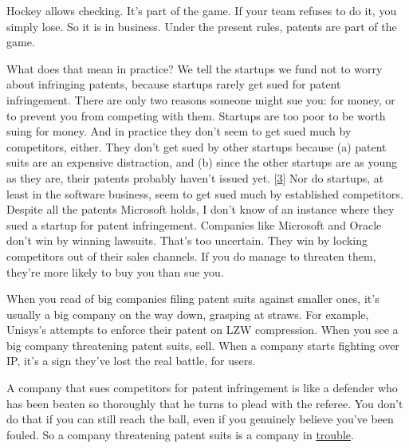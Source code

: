 Hockey allows
                  checking. It's part of the game. If your team refuses to do
                  it, you simply lose. So it is in business. Under the present
                  rules, patents are part of the game.

What does that
                  mean in practice? We tell the startups we fund not to worry
                  about infringing patents, because startups rarely get sued for
                  patent infringement. There are only two reasons someone might
                  sue you: for money, or to prevent you from competing with
                  them. Startups are too poor to be worth suing for money. And
                  in practice they don't seem to get sued much by competitors,
                  either. They don't get sued by other startups because (a)
                  patent suits are an expensive distraction, and (b) since the
                  other startups are as young as they are, their patents
                  probably haven't issued yet.
                  [\href{\#f3n}{3}]
                  Nor do startups, at least in the software business, seem to
                  get sued much by established competitors. Despite all the
                  patents Microsoft holds, I don't know of an instance where
                  they sued a startup for patent infringement. Companies like
                  Microsoft and Oracle don't win by winning lawsuits. That's too
                  uncertain. They win by locking competitors out of their sales
                  channels. If you do manage to threaten them, they're more
                  likely to buy you than sue you.

When you read of
                  big companies filing patent suits against smaller ones, it's
                  usually a big company on the way down, grasping at straws. For
                  example, Unisys's attempts to enforce their patent on LZW
                  compression. When you see a big company threatening patent
                  suits, sell. When a company starts fighting over IP, it's a
                  sign they've lost the real battle, for users.

A
                  company that sues competitors for patent infringement is like
                  a defender who has been beaten so thoroughly that he turns to
                  plead with the referee. You don't do that if you can still
                  reach the ball, even if you genuinely believe you've been
                  fouled. So a company threatening patent suits is a company in
                  \href{http://www.theregister.co.uk/2006/03/15/azul\_sues\_sun/}{trouble}.

